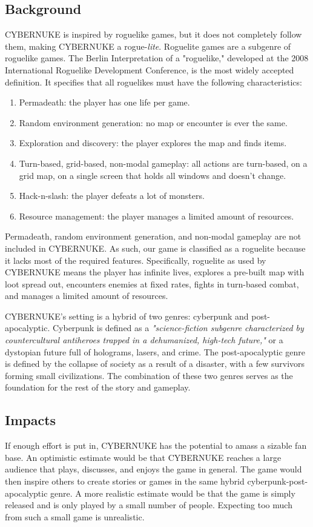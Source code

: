 \documentclass[10pt,conference,onecolumn,compsoc]{IEEEtran}
\begin{document}
\pagebreak
\subsection{Background}
CYBERNUKE is inspired by roguelike games, but it does not completely follow them, making CYBERNUKE a rogue-\emph{lite}. Roguelite games are a subgenre of roguelike games. The Berlin Interpretation of a "roguelike," developed at the 2008 International Roguelike Development Conference, is the most widely accepted definition. It specifies that all roguelikes must have the following characteristics:\cite{IEEEhowto:roguelite_2}
\begin{enumerate}
\item Permadeath: the player has one life per game.
\item Random environment generation: no map or encounter is ever the same.
\item Exploration and discovery: the player explores the map and finds items.
\item Turn-based, grid-based, non-modal gameplay: all actions are turn-based, on a grid map, on a single screen that holds all windows and doesn't change.
\item Hack-n-slash: the player defeats a lot of monsters.
\item Resource management: the player manages a limited amount of resources.
\end{enumerate}
Permadeath, random environment generation, and non-modal gameplay are not included in CYBERNUKE. As such, our game is classified as a roguelite because it lacks most of the required features. Specifically, roguelite as used by CYBERNUKE means the player has infinite lives, explores a pre-built map with loot spread out, encounters enemies at fixed rates, fights in turn-based combat, and manages a limited amount of resources.

CYBERNUKE's setting is a hybrid of two genres: cyberpunk and post-apocalyptic.
Cyberpunk is defined as a \emph{"science-fiction subgenre characterized by countercultural antiheroes trapped in a dehumanized, high-tech future,"}\cite{IEEEhowto:cyberpunk} or a dystopian future full of holograms, lasers, and crime. The post-apocalyptic genre is defined by the collapse of society as a result of a disaster, with a few survivors forming small civilizations. The combination of these two genres serves as the foundation for the rest of the story and gameplay. 

\subsection{Impacts}
If enough effort is put in, CYBERNUKE has the potential to amass a sizable fan base. An optimistic estimate would be that CYBERNUKE reaches a large audience that plays, discusses, and enjoys the game in general. The game would then inspire others to create stories or games in the same hybrid cyberpunk-post-apocalyptic genre. A more realistic estimate would be that the game is simply released and is only played by a small number of people. Expecting too much from such a small game is unrealistic. 
\end{document}
